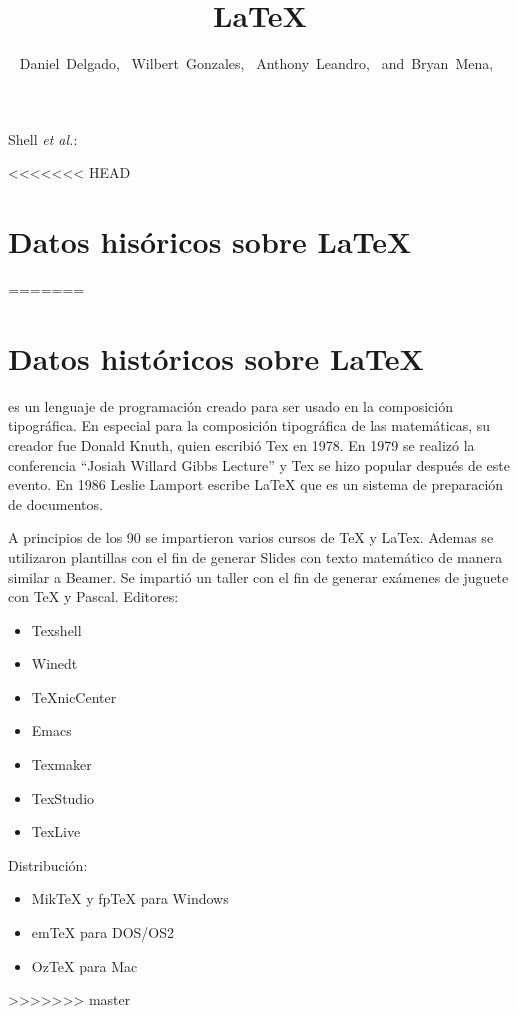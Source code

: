 \documentclass[10pt,journal,compsoc]{IEEEtran}
\begin{document}
\title{\LaTeX}

\author{Daniel~Delgado,~
        Wilbert~Gonzales,~
        Anthony~Leandro,~
        and~Bryan~Mena,~
}
{Shell \MakeLowercase{\textit{et al.}}: \LaTex}

\maketitle

\IEEEdisplaynontitleabstractindextext

\IEEEpeerreviewmaketitle

<<<<<<< HEAD
\section{Datos his\'oricos sobre LaTeX}
=======
\section{Datos hist\'oricos sobre LaTeX}
 es un lenguaje de programaci\'on creado para ser usado en la composici\'on tipogr\'afica. En especial para la composici\'on tipogr\'afica de las matem\'aticas, su creador fue Donald Knuth, quien escribi\'o Tex en 1978.
En 1979 se realiz\'o la conferencia “Josiah Willard Gibbs Lecture” y Tex se hizo popular despu\'es de este evento.
En 1986 Leslie Lamport escribe LaTeX que es un sistema de preparaci\'on de documentos.

A principios de los 90 se impartieron varios cursos de TeX y LaTex. Ademas se utilizaron plantillas con el fin de generar Slides con texto matem\'atico de manera similar a Beamer.
Se imparti\'o un taller con el fin de generar ex\'amenes de juguete con TeX y Pascal.
Editores:
\begin{itemize}
	\item Texshell
	\item Winedt
	\item TeXnicCenter
	\item Emacs
	\item Texmaker
	\item TexStudio
	\item TexLive
\end{itemize}
Distribuci\'on:
\begin{itemize}
	\item MikTeX y fpTeX para Windows
	\item emTeX para DOS/OS2
	\item OzTeX para Mac
\end{itemize}
>>>>>>> master
\end{document}
